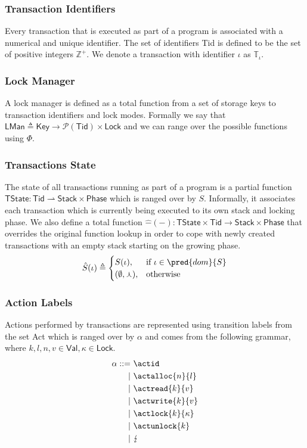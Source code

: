 \subsubsection{Transaction Identifiers}

Every transaction that is executed as part of a program is associated with a numerical and unique identifier. The set of identifiers \textsf{Tid} is defined to be the set of positive integers $\mathds{Z}^+$. We denote a transaction with identifier $\iota$ as $\mathds{T}_\iota$.

\subsubsection{Lock Manager}

A lock manager is defined as a total function from a set of storage keys to transaction identifiers and lock modes. Formally we say that $\mathsf{LMan} \triangleq \mathsf{Key} \rightarrow \mathcal{P}(\mathsf{Tid}) \times \mathsf{Lock}$ and we can range over the possible functions using $\Phi$.

\subsubsection{Transactions State}

The state of all transactions running as part of a program is a partial function $\mathsf{TState} : \mathsf{Tid} \rightharpoonup \mathsf{Stack} \times \mathsf{Phase}$ which is ranged over by $S$. Informally, it associates each transaction which is currently being executed to its own stack and locking phase. We also define a total function $\hat{-}(-) : \mathsf{TState} \times \mathsf{Tid} \rightarrow \mathsf{Stack} \times \mathsf{Phase}$ that overrides the original function lookup in order to cope with newly created transactions with an empty stack starting on the growing phase.
\[
\hat{S}(\iota) \triangleq \begin{cases}
S(\iota), & \text{if } \iota \in \pred{dom}{S} \\
(\emptyset, \curlywedge), & \text{otherwise}
\end{cases}
\]

\subsubsection{Action Labels}

Actions performed by transactions are represented using transition labels from the set \textsf{Act} which is ranged over by $\alpha$ and comes from the following grammar, where $k, l, n, v \in \mathsf{Val}, \kappa \in \mathsf{Lock}$.
\begin{align*}
\alpha ::=&
\ \actid \\
|&\ \actalloc{n}{l} \\
|&\ \actread{k}{v} \\
|&\ \actwrite{k}{v} \\
|&\ \actlock{k}{\kappa} \\
|&\ \actunlock{k} \\
|&\ \lightning
\end{align*}

